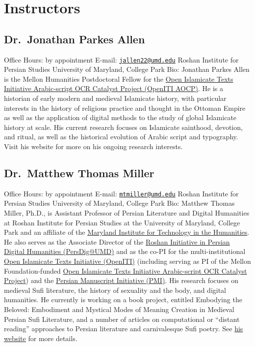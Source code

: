 \documentclass[
]{book}
\begin{document}
\hypertarget{instructors}{%
\section{Instructors}\label{instructors}}

\hypertarget{dr.-jonathan-parkes-allen}{%
\subsection{Dr.~Jonathan Parkes Allen}\label{dr.-jonathan-parkes-allen}}

Office Hours: by appointment
E-mail: \href{mailto:jallen22@umd.edu}{\nolinkurl{jallen22@umd.edu}}
Roshan Institute for Persian Studies
University of Maryland, College Park
Bio: Jonathan Parkes Allen is the Mellon Humanities Postdoctoral Fellow for the \href{https://medium.com/@openiti/openiti-aocp-9802865a6586}{Open Islamicate Texts Initiative Arabic-script OCR Catalyst Project (OpenITI AOCP)}. He is a historian of early modern and medieval Islamicate history, with particular interests in the history of religious practice and thought in the Ottoman Empire as well as the application of digital methods to the study of global Islamicate history at scale. His current research focuses on Islamicate sainthood, devotion, and ritual, as well as the historical evolution of Arabic script and typography. Visit his website for more on his ongoing research interests.

\hypertarget{dr.-matthew-thomas-miller}{%
\subsection{Dr.~Matthew Thomas Miller}\label{dr.-matthew-thomas-miller}}

Office Hours: by appointment
E-mail: \href{mailto:mtmiller@umd.edu}{\nolinkurl{mtmiller@umd.edu}}
Roshan Institute for Persian Studies
University of Maryland, College Park
Bio: Matthew Thomas Miller, Ph.D., is Assistant Professor of Persian Literature and Digital Humanities at Roshan Institute for Persian Studies at the University of Maryland, College Park and an affiliate of the \href{https://mith.umd.edu/people/}{Maryland Institute for Technology in the Humanities}. He also serves as the Associate Director of the \href{http://persdig.umd.edu/}{Roshan Initiative in Persian Digital Humanities (PersDig@UMD)} and as the co-PI for the multi-institutional \href{http://iti-corpus.github.io/}{Open Islamicate Texts Initiative (OpenITI)} (including serving as PI of the Mellon Foundation-funded \href{https://medium.com/@openiti/openiti-aocp-9802865a6586}{Open Islamicate Texts Initiative Arabic-script OCR Catalyst Project}) and the \href{http://www.persianmanuscript.org/}{Persian Manuscript Initiative (PMI)}. His research focuses on medieval Sufi literature, the history of sexuality and the body, and digital humanities. He currently is working on a book project, entitled Embodying the Beloved: Embodiment and Mystical Modes of Meaning Creation in Medieval Persian Sufi Literature, and a number of articles on computational or ``distant reading'' approaches to Persian literature and carnivalesque Sufi poetry. See \href{http://www.matthewthomasmiller.com/}{his website} for more details.
\end{document}
